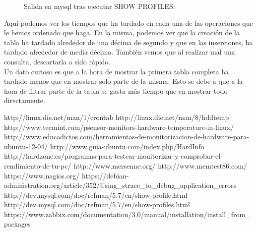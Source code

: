 \begin{itemize}
\begin{figure}[H]
	\caption[mysqlProfiles]{Salida en mysql tras ejecutar SHOW PROFILES.}
	\label{fig:mysqlProfiles}
	\end{figure}
	Aquí podemos ver los tiempos que ha tardado en cada una de las operaciones que le hemos ordenado que haga. En la misma, podemos ver que la creación de la tabla ha tardado alrededor de una décima de segundo y que en las inserciones, ha tardado alrededor de media décima. También vemos que al realizar mal una consulta, descartarla a sido rápido. \\
	Un dato curioso es que a la hora de mostrar la primera tabla completa  ha tardado menos que en mostrar solo parte de la misma. Esto se debe a que a la hora de filtrar parte de la tabla se gasta más tiempo que en mostrar todo directamente.

\end{itemize}
\newpage
\begin{thebibliography}{xx}
	 http://linux.die.net/man/1/crontab
	 http://linux.die.net/man/8/hddtemp
	 http://www.tecmint.com/psensor-monitors-hardware-temperature-in-linux/
	 http://www.educadictos.com/herramientas-de-monitorizacion-de-hardware-para-ubuntu-12-04/
	 http://www.guia-ubuntu.com/index.php/HardInfo
	 http://hardzone.es/programas-para-testear-monitorizar-y-comprobar-el-rendimiento-de-tu-pc/
	 http://www.mersenne.org/
	 http://www.memtest86.com/
	 https://www.nagios.org/
	 https://debian-administration.org/article/352/Using\_strace\_to\_debug\_application\_errors
	 http://dev.mysql.com/doc/refman/5.7/en/show-profile.html
	 http://dev.mysql.com/doc/refman/5.7/en/show-profiles.html
	 https://www.zabbix.com/documentation/3.0/manual/installation/install\_from\_packages
	
\end{thebibliography}
